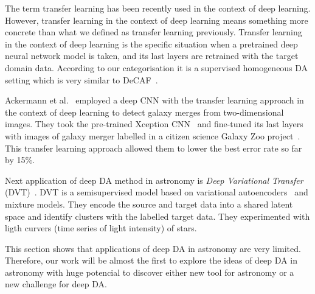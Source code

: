 The term transfer learning has been recently used in the context of deep learning.
However, transfer learning in the context of deep learning means something more concrete than what we defined as transfer learning previously.
Transfer learning in the context of deep learning is the specific situation
when a pretrained deep neural network model is taken,
and its last layers are retrained with the target domain data.
According to our categorisation it is a supervised homogeneous DA setting
which is very similar to DeCAF~\cite{donahue2014}.

Ackermann et al.~\cite{ackermann2018} employed a deep CNN
with the transfer learning approach
in the context of deep learning to detect galaxy merges
from two-dimensional images.
They took the pre-trained Xception CNN~\cite{chollet2017}
and fine-tuned its last layers with images of galaxy merger labelled
in a citizen science Galaxy Zoo project~\cite{lintott2010}.
This transfer learning approach allowed them to lower the best error rate so far by 15\%.

Next application of deep DA method in astronomy is \textit{Deep Variational Transfer} (DVT)~\cite{belhaj2018}.
DVT is a semisupervised model based on variational autoencoders~\cite{kingma2014a} and mixture models.
They encode the source and target data into a shared latent space
and identify clusters with the labelled target data.
They experimented with ligth curvers (time series of light intensity) of stars.

This section shows that applications of deep DA in astronomy are very limited.
Therefore, our work will be almost the first to explore the ideas
of deep DA in astronomy with huge potencial to discover
either new tool for astronomy or a new challenge for deep DA.
